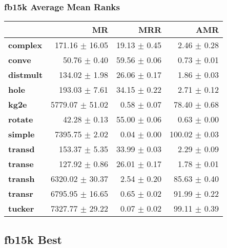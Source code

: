 \documentclass{article}
\begin{document}
\subsubsection{fb15k Average Mean Ranks}
    \begin{center}
    \begin{tabular}{lrrr}
\toprule
{} &               MR &           MRR &            AMR \\
\midrule
\textbf{complex } &   171.16 $\pm$ 16.05 &  19.13 $\pm$ 0.45 &    2.46 $\pm$ 0.28 \\
\textbf{conve   } &     50.76 $\pm$ 0.40 &  59.56 $\pm$ 0.06 &    0.73 $\pm$ 0.01 \\
\textbf{distmult} &    134.02 $\pm$ 1.98 &  26.06 $\pm$ 0.17 &    1.86 $\pm$ 0.03 \\
\textbf{hole    } &    193.03 $\pm$ 7.61 &  34.15 $\pm$ 0.22 &    2.71 $\pm$ 0.12 \\
\textbf{kg2e    } &  5779.07 $\pm$ 51.02 &   0.58 $\pm$ 0.07 &   78.40 $\pm$ 0.68 \\
\textbf{rotate  } &     42.28 $\pm$ 0.13 &  55.00 $\pm$ 0.06 &    0.63 $\pm$ 0.00 \\
\textbf{simple  } &   7395.75 $\pm$ 2.02 &   0.04 $\pm$ 0.00 &  100.02 $\pm$ 0.03 \\
\textbf{transd  } &    153.37 $\pm$ 5.35 &  33.99 $\pm$ 0.03 &    2.29 $\pm$ 0.09 \\
\textbf{transe  } &    127.92 $\pm$ 0.86 &  26.01 $\pm$ 0.17 &    1.78 $\pm$ 0.01 \\
\textbf{transh  } &  6320.02 $\pm$ 30.37 &   2.54 $\pm$ 0.20 &   85.63 $\pm$ 0.40 \\
\textbf{transr  } &  6795.95 $\pm$ 16.65 &   0.65 $\pm$ 0.02 &   91.99 $\pm$ 0.22 \\
\textbf{tucker  } &  7327.77 $\pm$ 29.22 &   0.07 $\pm$ 0.02 &   99.11 $\pm$ 0.39 \\
\bottomrule
\end{tabular}

    \end{center}
\subsection{fb15k Best}
\end{document}
